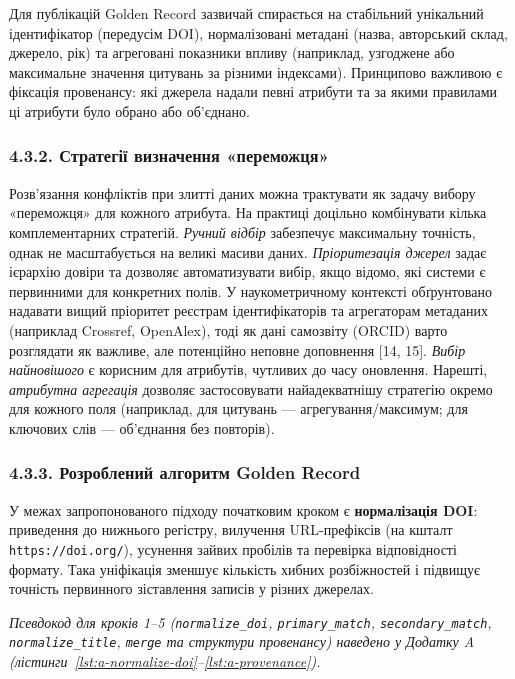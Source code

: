 Для публікацій Golden Record зазвичай спирається на стабільний унікальний ідентифікатор (передусім DOI), нормалізовані метадані (назва, авторський склад, джерело, рік) та агреговані показники впливу (наприклад, узгоджене або максимальне значення цитувань за різними індексами). Принципово важливою є фіксація провенансу: які джерела надали певні атрибути та за якими правилами ці атрибути було обрано або об'єднано.

\subsubsection*{4.3.2. Стратегії визначення «переможця»}

Розв'язання конфліктів при злитті даних можна трактувати як задачу вибору «переможця» для кожного атрибута. На практиці доцільно комбінувати кілька комплементарних стратегій. \textit{Ручний відбір} забезпечує максимальну точність, однак не масштабується на великі масиви даних. \textit{Пріоритезація джерел} задає ієрархію довіри та дозволяє автоматизувати вибір, якщо відомо, які системи є первинними для конкретних полів. У наукометричному контексті обґрунтовано надавати вищий пріоритет реєстрам ідентифікаторів та агрегаторам метаданих (наприклад Crossref, OpenAlex), тоді як дані самозвіту (ORCID) варто розглядати як важливе, але потенційно неповне доповнення [14, 15]. \textit{Вибір найновішого} є корисним для атрибутів, чутливих до часу оновлення. Нарешті, \textit{атрибутна агрегація} дозволяє застосовувати найадекватнішу стратегію окремо для кожного поля (наприклад, для цитувань --- агрегування/максимум; для ключових слів --- об'єднання без повторів).

\subsubsection*{4.3.3. Розроблений алгоритм Golden Record}

У межах запропонованого підходу початковим кроком є \textbf{нормалізація DOI}: приведення до нижнього регістру, вилучення URL-префіксів (на кшталт \texttt{https://doi.org/}), усунення зайвих пробілів та перевірка відповідності формату. Така уніфікація зменшує кількість хибних розбіжностей і підвищує точність первинного зіставлення записів у різних джерелах.

\textit{Псевдокод для кроків 1--5 (\texttt{normalize\_doi}, \texttt{primary\_match}, \texttt{secondary\_match}, \texttt{normalize\_title}, \texttt{merge} та структури провенансу) наведено у Додатку A (лістинги~\ref{lst:a-normalize-doi}--\ref{lst:a-provenance}).}

